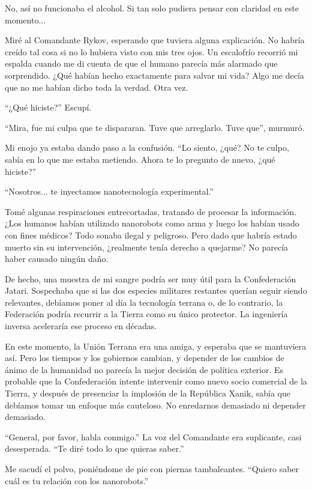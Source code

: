 \documentclass[spanish,12pt,a4paper,oneside,titlepage]{book}
\begin{document}
    No, así no funcionaba el alcohol. Si tan solo pudiera pensar con claridad en este momento...

    Miré al Comandante Rykov, esperando que tuviera alguna explicación. No habría creído tal cosa si no lo hubiera visto con mis tres ojos. Un escalofrío recorrió mi espalda cuando me di cuenta de que el humano parecía más alarmado que sorprendido. ¿Qué habían hecho exactamente para salvar mi vida? Algo me decía que no me habían dicho toda la verdad. Otra vez.

    ``¿Qué hiciste?'' Escupí.

    ``Mira, fue mi culpa que te dispararan. Tuve que arreglarlo. Tuve que'', murmuró.

    Mi enojo ya estaba dando paso a la confusión. ``Lo siento, ¿qué? No te culpo, sabía en lo que me estaba metiendo. Ahora te lo pregunto de nuevo, ¿qué hiciste?''

    ``Nosotros... te inyectamos nanotecnología experimental.''

    Tomé algunas respiraciones entrecortadas, tratando de procesar la información. ¿Los humanos habían utilizado nanorobots como arma y luego los habían usado con fines médicos? Todo sonaba ilegal y peligroso. Pero dado que habría estado muerto sin su intervención, ¿realmente tenía derecho a quejarme? No parecía haber causado ningún daño.

    De hecho, una muestra de mi sangre podría ser muy útil para la Confederación Jatari. Sospechaba que si las dos especies militares restantes querían seguir siendo relevantes, debíamos poner al día la tecnología terrana o, de lo contrario, la Federación podría recurrir a la Tierra como su único protector. La ingeniería inversa aceleraría ese proceso en décadas.

    En este momento, la Unión Terrana era una amiga, y esperaba que se mantuviera así. Pero los tiempos y los gobiernos cambian, y depender de los cambios de ánimo de la humanidad no parecía la mejor decisión de política exterior. Es probable que la Confederación intente intervenir como nuevo socio comercial de la Tierra, y después de presenciar la implosión de la República Xanik, sabía que debíamos tomar un enfoque más cauteloso. No enredarnos demasiado ni depender demasiado.

    ``General, por favor, habla conmigo.'' La voz del Comandante era suplicante, casi desesperada. ``Te diré todo lo que quieras saber.''

    Me sacudí el polvo, poniéndome de pie con piernas tambaleantes. ``Quiero saber cuál es tu relación con los nanorobots.''
\end{document}
